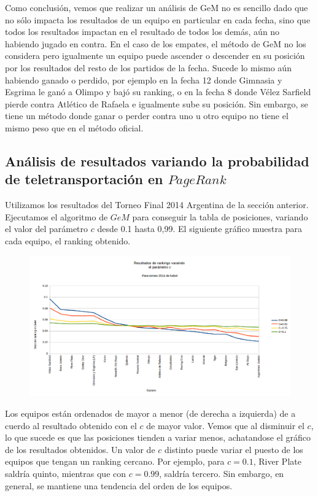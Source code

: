 Como conclusión, vemos que realizar un análisis de GeM no es sencillo dado que no sólo impacta los resultados de un equipo en particular en cada fecha, sino que todos los resultados impactan en el resultado de todos los demás, aún no habiendo jugado en contra. En el caso de los empates, el método de GeM no los considera pero igualmente un equipo puede ascender o descender en su posición por los resultados del resto de los partidos de la fecha. Sucede lo mismo aún habiendo ganado o perdido, por ejemplo en la fecha 12 donde Gimnasia y Esgrima le ganó a Olimpo y bajó su ranking, o en la fecha 8 donde Vélez Sarfield pierde contra Atlético de Rafaela e igualmente sube su posición. Sin embargo, se tiene un método donde ganar o perder contra uno u otro equipo no tiene el mismo peso que en el método oficial.


\subsection{Análisis de resultados variando la probabilidad de teletransportación en $PageRank$}

Utilizamos los resultados del Torneo Final 2014 Argentina de la sección anterior. Ejecutamos el algoritmo de $GeM$ para conseguir la tabla de posiciones, variando el valor del parámetro $c$ desde 0.1 hasta 0,99. El siguiente gráfico muestra para cada equipo, el ranking obtenido.\\

\begin{figure}[H]
\centering
\includegraphics[width=0.7\linewidth]{imagenes/varicionCfutbol2014Ordenado.png}
\end{figure}

Los equipos están ordenados de mayor a menor (de derecha a izquierda) de a cuerdo al resultado obtenido con el $c$ de mayor valor. Vemos que al disminuir el $c$, lo que sucede es que las posiciones tienden a variar menos, achatandose el gráfico de los resultados obtenidos.
Un valor de $c$ distinto puede variar el puesto de los equipos que tengan un ranking cercano. Por ejemplo, para $c=0.1$, River Plate saldría quinto, mientras que con $c=0.99$, saldría tercero. Sin embargo, en general, se mantiene una tendencia del orden de los equipos. \\

